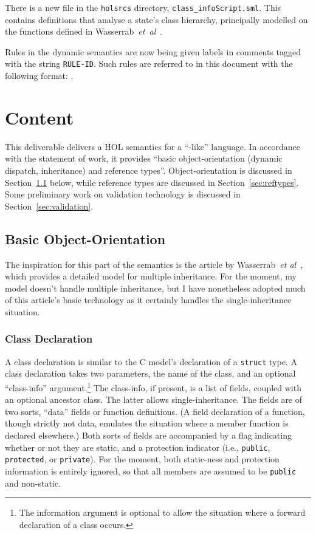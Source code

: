 \documentclass[11pt]{article}
\begin{document}
There is a new file in the \texttt{holsrcs} directory,
\texttt{class\_infoScript.sml}.  This contains definitions that
analyse a state's class hierarchy, principally modelled on the
functions defined in
Wasserrab~\emph{et~al}~\cite{wasserrab-nst-OOPSLA06}.

Rules in the dynamic semantics are now being given labels in comments
tagged with the string \texttt{RULE-ID}.  Such rules are referred to
in this document with the following format: .

\section{Content}

This deliverable delivers a HOL semantics for a ``\cpp-like''
language.  In accordance with the statement of work, it provides
``basic object-orientation (dynamic dispatch, inheritance) and
reference types''.  Object-orientation is discussed in
Section~\ref{sec:basic-oo} below, while reference types are discussed
in Section~\ref{sec:reftypes}.  Some preliminary work on validation
technology is discussed in Section~\ref{sec:validation}.

\subsection{Basic Object-Orientation}
\label{sec:basic-oo}

The inspiration for this part of the semantics is the article by
Wasserrab~\emph{et al}~\cite{wasserrab-nst-OOPSLA06}, which provides a
detailed model for multiple inheritance.  For the moment, my model
doesn't handle multiple inheritance, but I have nonetheless adopted
much of this article's basic technology as it certainly handles the
single-inheritance situation.

\subsubsection{Class Declaration}
\label{sec:class-declaration}
A class declaration is similar to the C model's declaration of a
\texttt{struct} type.  A class declaration takes two parameters, the
name of the class, and an optional ``class-info''
argument.\footnote{The information argument is optional to allow the
  situation where a forward declaration of a class occurs.}  The
class-info, if present, is a list of fields, coupled with an optional
ancestor class.  The latter allows single-inheritance.  The fields are
of two sorts, ``data'' fields or function definitions.  (A field
declaration of a function, though strictly not data, emulates the
situation where a member function is declared elsewhere.)  Both sorts
of fields are accompanied by a flag indicating whether or not they are
static, and a protection indicator (i.e., \texttt{public},
\texttt{protected}, or \texttt{private}).  For the moment, both
static-ness and protection information is entirely ignored, so that
all members are assumed to be \texttt{public} and non-static.
\end{document}
